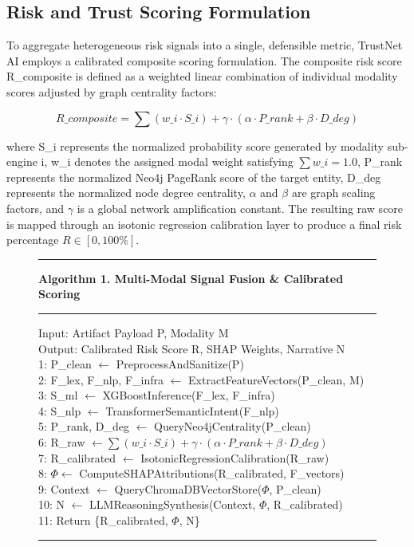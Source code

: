\documentclass[conference,a4paper]{IEEEtran}
\begin{document}
\subsection{Risk and Trust Scoring Formulation}
To aggregate heterogeneous risk signals into a single, defensible metric, TrustNet AI employs a calibrated composite scoring formulation. The composite risk score R\_composite is defined as a weighted linear combination of individual modality scores adjusted by graph centrality factors:

\begin{equation}
R\_composite = \sum (w\_i \cdot S\_i) + \gamma \cdot (\alpha \cdot P\_rank + \beta \cdot D\_deg)
\end{equation}

where S\_i represents the normalized probability score generated by modality sub-engine i, w\_i denotes the assigned modal weight satisfying $\sum w\_i = 1.0$, P\_rank represents the normalized Neo4j PageRank score of the target entity, D\_deg represents the normalized node degree centrality, $\alpha$ and $\beta$ are graph scaling factors, and $\gamma$ is a global network amplification constant. The resulting raw score is mapped through an isotonic regression calibration layer to produce a final risk percentage $R \in [0, 100\%]$.

\begin{figure}[H]
\rule{\linewidth}{1pt}
\textbf{Algorithm 1. Multi-Modal Signal Fusion \& Calibrated Scoring}
\rule{\linewidth}{0.5pt}
Input: Artifact Payload P, Modality M\\
Output: Calibrated Risk Score R, SHAP Weights, Narrative N\\
1: P\_clean $\leftarrow$ PreprocessAndSanitize(P)\\
2: F\_lex, F\_nlp, F\_infra $\leftarrow$ ExtractFeatureVectors(P\_clean, M)\\
3: S\_ml $\leftarrow$ XGBoostInference(F\_lex, F\_infra)\\
4: S\_nlp $\leftarrow$ TransformerSemanticIntent(F\_nlp)\\
5: P\_rank, D\_deg $\leftarrow$ QueryNeo4jCentrality(P\_clean)\\
6: R\_raw $\leftarrow \sum(w\_i \cdot S\_i) + \gamma \cdot (\alpha \cdot P\_rank + \beta \cdot D\_deg)$\\
7: R\_calibrated $\leftarrow$ IsotonicRegressionCalibration(R\_raw)\\
8: $\Phi \leftarrow$ ComputeSHAPAttributions(R\_calibrated, F\_vectors)\\
9: Context $\leftarrow$ QueryChromaDBVectorStore($\Phi$, P\_clean)\\
10: N $\leftarrow$ LLMReasoningSynthesis(Context, $\Phi$, R\_calibrated)\\
11: Return \{R\_calibrated, $\Phi$, N\}
\rule{\linewidth}{1pt}
\end{figure}
\end{document}
